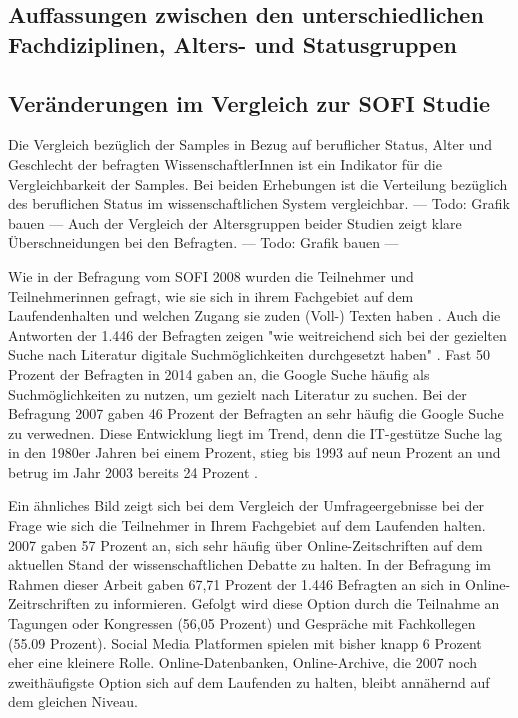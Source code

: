 \subsection{Auffassungen zwischen den unterschiedlichen Fachdiziplinen, Alters- und Statusgruppen}



\subsection{Veränderungen im Vergleich zur SOFI Studie}

Die Vergleich bezüglich der Samples in Bezug auf beruflicher Status, Alter und Geschlecht der befragten WissenschaftlerInnen ist ein Indikator für die Vergleichbarkeit der Samples. Bei beiden Erhebungen ist die Verteilung bezüglich des beruflichen Status im wissenschaftlichen System vergleichbar.
--- Todo: Grafik bauen --- 
Auch der Vergleich der Altersgruppen beider Studien zeigt klare Überschneidungen bei den Befragten.  --- Todo: Grafik bauen --- 

Wie in der Befragung vom SOFI 2008 wurden die Teilnehmer und Teilnehmerinnen gefragt, wie sie sich in ihrem Fachgebiet auf dem Laufendenhalten und welchen Zugang sie zuden (Voll-) Texten haben \cite{hanekop_2008}. Auch die Antworten der 1.446 der Befragten zeigen "wie weitreichend sich bei der gezielten Suche nach Literatur digitale Suchmöglichkeiten durchgesetzt haben" \cite{hanekop_2008}. Fast 50 Prozent der Befragten in 2014 gaben an, die Google Suche häufig als Suchmöglichkeiten zu nutzen, um gezielt nach Literatur zu suchen. Bei der Befragung 2007 gaben 46 Prozent der Befragten an sehr häufig die Google Suche zu verwednen. Diese Entwicklung liegt im Trend, denn die IT-gestütze Suche lag in den 1980er Jahren bei einem Prozent, stieg bis 1993 auf neun Prozent an und betrug im Jahr 2003 bereits 24 Prozent \cite{hanekop_2008}.

Ein ähnliches Bild zeigt sich bei dem Vergleich der Umfrageergebnisse bei der Frage wie sich die Teilnehmer in Ihrem Fachgebiet auf dem Laufenden halten. 2007 gaben 57 Prozent an, sich sehr häufig über Online-Zeitschriften auf dem aktuellen Stand der wissenschaftlichen Debatte zu halten. In der Befragung im Rahmen dieser Arbeit gaben 67,71 Prozent der 1.446 Befragten an sich in Online-Zeitrschriften zu informieren. Gefolgt wird diese Option durch die Teilnahme an Tagungen oder Kongressen (56,05 Prozent) und Gespräche mit Fachkollegen (55.09 Prozent). Social Media Platformen spielen mit bisher knapp 6 Prozent eher eine kleinere Rolle. Online-Datenbanken, Online-Archive, die 2007 noch zweithäufigste Option sich auf dem Laufenden zu halten, bleibt annähernd auf dem gleichen Niveau.

